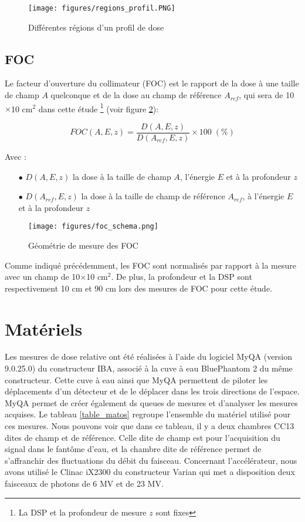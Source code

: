 \documentclass{book}
\begin{document}
\begin{figure}[h]
  \centering
  \texttt{[image: figures/regions\_profil.PNG]}
  \caption{Différentes régions d'un profil de dose}
  \label{fig_regions_profil}
\end{figure}

\newpage
\subsection{FOC}

Le facteur d'ouverture du collimateur (FOC) est le rapport de la dose à une taille de champ $A$ quelconque et de la dose au champ de référence $A_{ref}$, qui sera de 10$\times$10 cm$^2$ dans cette étude \footnote{La DSP et la profondeur de mesure $z$ sont fixes} (voir figure \ref*{fig_foc}):

\begin{equation}
    FOC(A, E, z) = \dfrac{D(A, E, z)}{D(A_{ref}, E, z)} \times 100 \; (\%)
    \label{eq_foc}
\end{equation}

Avec :

\begin{itemize}
    \item[$\bullet$] $D(A, E, z)$ la dose à la taille de champ $A$, l'énergie $E$ et à la profondeur $z$
    \item[$\bullet$] $D(A_{ref}, E, z)$ la dose à la taille de champ de référence $A_{ref}$, à l'énergie $E$ et à la profondeur $z$
\end{itemize}

\begin{figure}[h]
  \centering
  \texttt{[image: figures/foc\_schema.png]}
  \caption{Géométrie de mesure des FOC \cite{mayles2007handbook}}
  \label{fig_foc}
\end{figure}

Comme indiqué précédemment, les FOC sont normalisés par rapport à la mesure avec un champ de 10$\times$10 cm$^2$. De plus, la profondeur et la DSP sont respectivement 10 cm et 90 cm lors des mesures de FOC pour cette étude.

\section{Matériels}

Les mesures de dose relative ont été réalisées à l'aide du logiciel MyQA (version 9.0.25.0) du constructeur IBA, associé à la cuve à eau BluePhantom 2 du même constructeur. Cette cuve à eau ainsi que MyQA permettent de piloter les déplacements d'un détecteur et de le déplacer dans les trois directions de l'espace. MyQA permet de créer également ds queues de mesures et d'analyser les mesures acquises. Le tableau \ref*{table_matos} regroupe l'ensemble du matériel utilisé pour ces mesures. Nous pouvons voir que dans ce tableau, il y a deux chambres CC13 dites de champ et de référence. Celle dite de champ est pour l'acquisition du signal dans le fantôme d'eau, et la chambre dite de référence permet de s'affranchir des fluctuations du débit du faisceau. Concernant l'accélérateur, nous avons utilisé le Clinac iX2300 du constructeur Varian qui met a disposition deux faisceaux de photons de 6 MV et de 23 MV.
\end{document}
